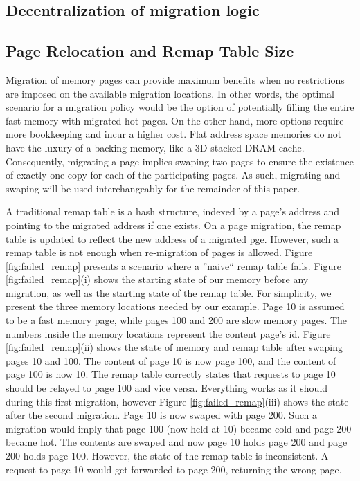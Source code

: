 \subsection{Decentralization of migration logic}

\subsection{Page Relocation and Remap Table Size}

Migration of memory pages can provide maximum benefits when no restrictions are imposed on the available migration locations. In other words, the optimal scenario for a migration policy would be the option of potentially filling the entire fast memory with migrated hot pages. On the other hand, more options require more bookkeeping and incur a higher cost. Flat address space memories do not have the luxury of a backing memory, like a 3D-stacked DRAM cache. Consequently, migrating a page implies swaping two pages to ensure the existence of exactly one copy for each of the participating pages. As such, migrating and swaping will be used interchangeably for the remainder of this paper.

A traditional remap table is a hash structure, indexed by a page's address and pointing to the migrated address if one exists. On a page migration, the remap table is updated to reflect the new address of a migrated pge. However, such a remap table is not enough when re-migration of pages is allowed. Figure \ref{fig:failed_remap} presents a scenario where a ''naive`` remap table fails. Figure \ref{fig:failed_remap}(i) shows the starting state of our memory before any migration, as well as the starting state of the remap table. For simplicity, we present the three memory locations needed by our example. Page 10 is assumed to be a fast memory page, while pages 100 and 200 are slow memory pages. The numbers inside the memory locations represent the content page's id. Figure \ref{fig:failed_remap}(ii) shows the state of memory and remap table after swaping pages 10 and 100. The content of page 10 is now page 100, and the content of page 100 is now 10. The remap table correctly states that requests to page 10 should be relayed to page 100 and vice versa.  Everything works as it should during this first migration, however Figure \ref{fig:failed_remap}(iii) shows the state after the second migration. Page 10 is now swaped with page 200. Such a migration would imply that page 100 (now held at 10) became cold and page 200 became hot. The contents are swaped and now page 10 holds page 200 and page 200 holds page 100. However, the state of the remap table is inconsistent. A request to page 10 would get forwarded to page 200, returning the wrong page.

